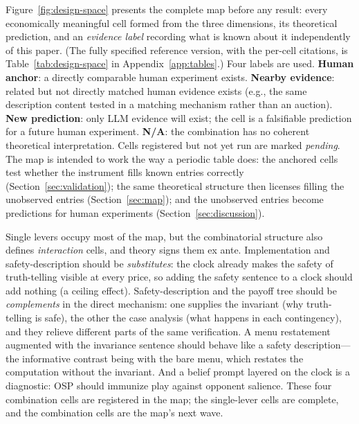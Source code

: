 Figure~\ref{fig:design-space} presents the complete map before any result: every economically meaningful cell formed from the three dimensions, its theoretical prediction, and an \emph{evidence label} recording what is known about it independently of this paper. (The fully specified reference version, with the per-cell citations, is Table~\ref{tab:design-space} in Appendix~\ref{app:tables}.) Four labels are used. \textbf{Human anchor}: a directly comparable human experiment exists. \textbf{Nearby evidence}: related but not directly matched human evidence exists (e.g., the same description content tested in a matching mechanism rather than an auction). \textbf{New prediction}: only LLM evidence will exist; the cell is a falsifiable prediction for a future human experiment. \textbf{N/A}: the combination has no coherent theoretical interpretation. Cells registered but not yet run are marked \emph{pending}. The map is intended to work the way a periodic table does: the anchored cells test whether the instrument fills known entries correctly (Section~\ref{sec:validation}); the same theoretical structure then licenses filling the unobserved entries (Section~\ref{sec:map}); and the unobserved entries become predictions for human experiments (Section~\ref{sec:discussion}).

Single levers occupy most of the map, but the combinatorial structure also defines \emph{interaction} cells, and theory signs them ex ante. Implementation and safety-description should be \emph{substitutes}: the clock already makes the safety of truth-telling visible at every price, so adding the safety sentence to a clock should add nothing (a ceiling effect). Safety-description and the payoff tree should be \emph{complements} in the direct mechanism: one supplies the invariant (why truth-telling is safe), the other the case analysis (what happens in each contingency), and they relieve different parts of the same verification. A menu restatement augmented with the invariance sentence should behave like a safety description---the informative contrast being with the bare menu, which restates the computation without the invariant. And a belief prompt layered on the clock is a diagnostic: OSP should immunize play against opponent salience. These four combination cells are registered in the map; the single-lever cells are complete, and the combination cells are the map's next wave. 

